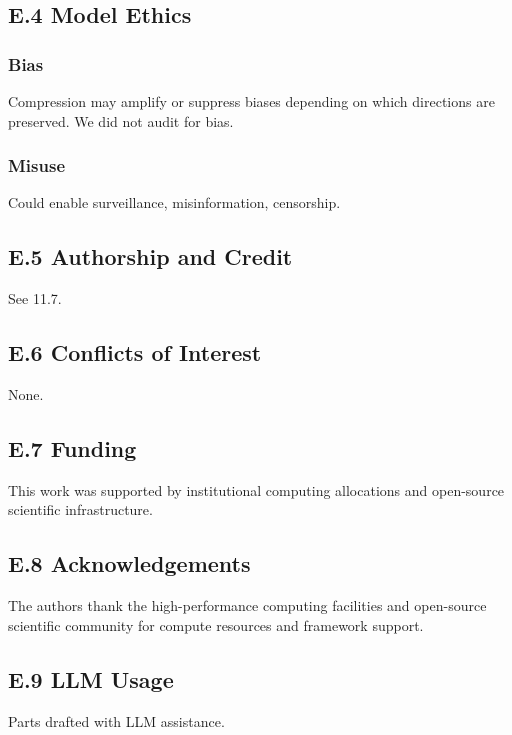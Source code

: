 \subsection{E.4 Model Ethics}

\subsubsection{Bias}

Compression may amplify or suppress biases depending on which directions 
are preserved. We did not audit for bias.

\subsubsection{Misuse}

Could enable surveillance, misinformation, censorship.

\subsection{E.5 Authorship and Credit}

See  11.7.

\subsection{E.6 Conflicts of Interest}

None.

\subsection{E.7 Funding}

This work was supported by institutional computing allocations and open-source scientific infrastructure.

\subsection{E.8 Acknowledgements}

The authors thank the high-performance computing facilities and open-source scientific community for compute resources and framework support.

\subsection{E.9 LLM Usage}

Parts drafted with LLM assistance.

